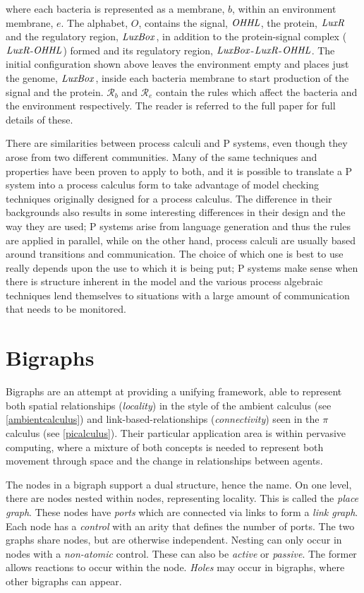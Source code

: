 \noindent where each bacteria is represented as a membrane, $b$, within
an environment membrane, $e$.  The alphabet, $O$, contains the signal,
$\mathit{OHHL}$, the protein, $\mathit{LuxR}$ and the regulatory region, $\mathit{LuxBox}$, in
addition to the protein-signal complex ($\mathit{LuxR}$-$\mathit{OHHL}$) formed and its
regulatory region, $\mathit{LuxBox}$-$\mathit{LuxR}$-$\mathit{OHHL}$.  The initial configuration shown
above leaves the environment empty and places just the genome, $\mathit{LuxBox}$,
inside each bacteria membrane to start production of the signal and the
protein.  $\mathcal{R}_b$ and $\mathcal{R}_e$ contain the rules which
affect the bacteria and the environment respectively.  The reader is
referred to the full paper for full details of these.

There are similarities between process calculi and P systems, even
though they arose from two different communities.  Many of the same
techniques and properties have been proven to apply to both, and it is
possible to translate a P system into a process calculus form to take
advantage of model checking techniques originally designed for a
process calculus.  The difference in their backgrounds also results in
some interesting differences in their design and the way they are
used; P systems arise from language generation and thus the rules are
applied in parallel, while on the other hand, process calculi are
usually based around transitions and communication.  The choice of
which one is best to use really depends upon the use to which it is
being put; P systems make sense when there is structure inherent in
the model and the various process algebraic techniques lend themselves
to situations with a large amount of communication that needs to be
monitored.

\section{Bigraphs}
\label{bigraphs}

Bigraphs \cite{bigraph1,bigraph2} are an attempt at providing a
unifying framework, able to represent both spatial relationships
(\emph{locality}) in the style of the ambient calculus (see
\ref{ambientcalculus}) and link-based-relationships
(\emph{connectivity}) seen in the $\pi$ calculus (see \ref{picalculus}).
Their particular application area is within pervasive computing, where a
mixture of both concepts is needed to represent both movement through
space and the change in relationships between agents.

The nodes in a bigraph support a dual structure, hence the name.  On one
level, there are nodes nested within nodes, representing locality.  This
is called the \emph{place graph}.  These nodes have \emph{ports} which
are connected via links to form a \emph{link graph}.  Each node has a
\emph{control} with an arity that defines the number of ports.  The two
graphs share nodes, but are otherwise independent.  Nesting can only
occur in nodes with a \emph{non-atomic} control.  These can also be
\emph{active} or \emph{passive}.  The former allows reactions to occur
within the node.  \emph{Holes} may occur in bigraphs, where other
bigraphs can appear.

